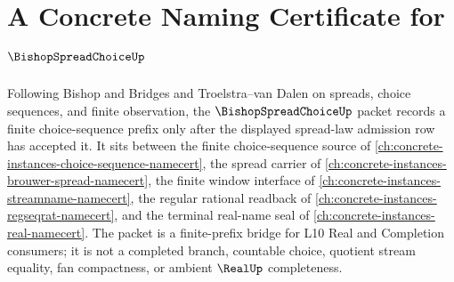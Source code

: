\chapter{A Concrete Naming Certificate for $\BishopSpreadChoiceUp$}
\label{ch:concrete-instances-bishop-spread-choice-namecert}

Following Bishop and Bridges and Troelstra--van Dalen on spreads, choice sequences, and finite observation, the $\BishopSpreadChoiceUp$ packet records a finite choice-sequence prefix only after the displayed spread-law admission row has accepted it. It sits between the finite choice-sequence source of \autoref{ch:concrete-instances-choice-sequence-namecert}, the spread carrier of \autoref{ch:concrete-instances-brouwer-spread-namecert}, the finite window interface of \autoref{ch:concrete-instances-streamname-namecert}, the regular rational readback of \autoref{ch:concrete-instances-regseqrat-namecert}, and the terminal real-name seal of \autoref{ch:concrete-instances-real-namecert}. The packet is a finite-prefix bridge for L10 Real and Completion consumers; it is not a completed branch, countable choice, quotient stream equality, fan compactness, or ambient $\RealUp$ completeness.

